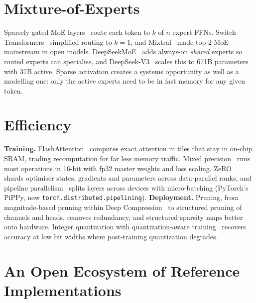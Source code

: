 \documentclass[11pt]{article}
\begin{document}
\section{Mixture-of-Experts}

Sparsely gated MoE layers~\cite{shazeer2017outrageously} route each token to $k$ of $n$ expert
FFNs. Switch Transformers~\cite{fedus2022switch} simplified routing to $k=1$, and
Mixtral~\cite{jiang2024mixtral} made top-2 MoE mainstream in open models. DeepSeekMoE~\cite{dai2024deepseekmoe}
adds always-on \emph{shared} experts so routed experts can specialise, and DeepSeek-V3~\cite{deepseekv3}
scales this to 671B parameters with 37B active. Sparse activation creates a systems
opportunity as well as a modelling one: only the active experts need to be in fast memory
for any given token.

\section{Efficiency}

\textbf{Training.} FlashAttention~\cite{dao2022flashattention} computes exact attention in tiles
that stay in on-chip SRAM, trading recomputation for far less memory traffic. Mixed
precision~\cite{micikevicius2018mixed} runs most operations in 16-bit with fp32 master weights and
loss scaling. ZeRO~\cite{rajbhandari2020zero} shards optimiser states, gradients and parameters
across data-parallel ranks, and pipeline parallelism~\cite{huang2019gpipe} splits layers across
devices with micro-batching (PyTorch's PiPPy, now \texttt{torch.distributed.pipelining}).
\textbf{Deployment.} Pruning, from magnitude-based pruning within Deep
Compression~\cite{han2016deepcompression} to structured pruning of channels and heads, removes
redundancy, and structured sparsity maps better onto hardware. Integer quantization with
quantization-aware training~\cite{jacob2018quant} recovers accuracy at low bit widths where
post-training quantization degrades.

\section{An Open Ecosystem of Reference Implementations}
\end{document}
